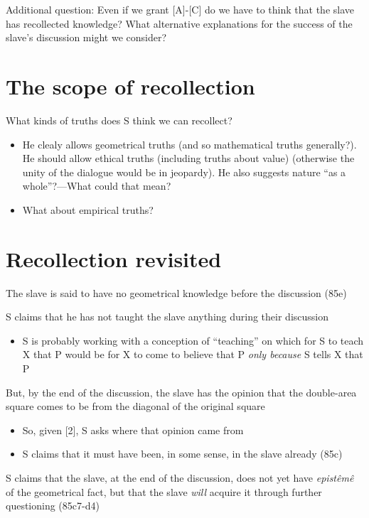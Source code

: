 \documentclass[11pt]{article}
\begin{document}
\noindent Additional question: Even if we grant [A]-[C] do we have to think that the slave has recollected knowledge? What alternative explanations for the success of the slave's discussion might we consider?

\section*{The scope of recollection}

\noindent What kinds of truths does S think we can recollect?

\begin{itemize}\item{He clealy allows geometrical truths (and so mathematical truths generally?). He should allow ethical truths (including truths about value) (otherwise the unity of the dialogue would be in jeopardy). He also suggests nature ``as a whole''?---What could that mean?}\item{What about empirical truths?}\end{itemize}

\section*{Recollection revisited}

\noindent [1] The slave is said to have no geometrical knowledge before the discussion (85e)
\vspace*{2mm}

\noindent [2] S claims that he has not taught the slave anything during their discussion
\begin{itemize}\item{S is probably working with a conception of ``teaching'' on which for S to teach X that P would be for X to come to believe that P \emph{only because} S tells X that P}\end{itemize}

\noindent [3] But, by the end of the discussion, the slave has the opinion that the double-area square comes to be from the diagonal of the original square

\begin{itemize}\item{So, given [2], S asks where that opinion came from}\item{S claims that it must have been, in some sense, in the slave already (85c)}\end{itemize}

\noindent [4] S claims that the slave, at the end of the discussion, does not yet have \emph{epist\^{e}m\^{e}} of the geometrical fact, but that the slave \emph{will} acquire it through further questioning (85c7-d4)
\vspace*{2mm}
\end{document}
